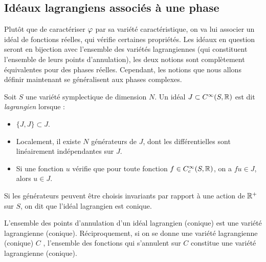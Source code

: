 \subsection{Idéaux lagrangiens associés à une phase}
Plutôt que de caractériser $\varphi$ par sa variété caractéristique, on va lui associer un idéal de fonctions réelles, qui vérifie certaines propriétés. Les idéaux en question seront en bijection avec l'ensemble des variétés lagrangiennes (qui constituent l'ensemble de leurs points d'annulation), les deux notions sont complètement équivalentes pour des phases réelles. Cependant, les notions que nous allons définir maintenant se généralisent aux phases complexes.

\begin{defn}Soit $S$ une variété symplectique de dimension $N$. Un idéal $J \subset C^{\infty}(S,\mathbb{R})$ est dit \emph{lagrangien} lorsque :
\begin{itemize}
  \item $\{J,J\}\subset J$.
  \item Localement, il existe $N$ générateurs de $J$, dont les différentielles sont linéairement indépendantes sur $J$.
  \item Si une fonction $u$ vérifie que pour toute fonction $f \in C^{\infty}_c(S,\mathbb{R})$, on a $fu \in J$, alors $u \in J$.
\end{itemize}
Si les générateurs peuvent être choisis invariants par rapport à une action de $\mathbb{R}^+$ sur $S$, on dit que l'idéal lagrangien est conique.
\end{defn}
\begin{rem}
	L'ensemble des points d'annulation d'un idéal lagrangien (conique) est une variété lagrangienne (conique). Réciproquement, si on se donne une variété lagrangienne (conique) $C$ , l'ensemble des fonctions qui s'annulent sur $C$ constitue une variété lagrangienne (conique).
\end{rem}

